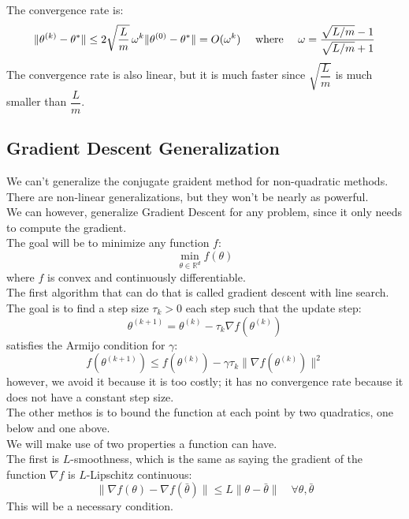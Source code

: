 \documentclass[12pt]{article}
\begin{document}
The convergence rate is:
\[ \|\theta^{(k)} - \theta^*\| \leq 2 
\sqrt{\frac{L}{m}} \, \omega^k \|\theta^{(0)} 
- \theta^*\| = O(\omega^k) 
\quad \text{ where } \quad \omega = 
\frac{\sqrt{L/m} - 1}{\sqrt{L/m} + 1} \]
The convergence rate is also linear, but it is much faster
since $\sqrt{\dfrac{L}{m}}$ is much smaller 
than $\dfrac{L}{m}$. \\
\newpage

\subsection*{Gradient Descent Generalization}

We can't generalize the conjugate graident method
for non-quadratic methods. \\
There are non-linear generalizations, 
but they won't be nearly as powerful. \\

We can however, generalize Gradient Descent
for any problem, since it only needs
to compute the gradient. \\

The goal will be to minimize any function $f$:
\[ \min_{\theta \in \mathbb{R}^d} f(\theta) \]
where $f$ is convex and continuously 
differentiable. \\

The first algorithm that can do that is called
gradient descent with line search. \\
The goal is to find a step size $\tau_k > 0$
each step such that the update step:
\[ \theta^{(k+1)} = \theta^{(k)} 
- \tau_k \nabla f(\theta^{(k)})\]
satisfies the Armijo condition for $\gamma$:
\[ f(\theta^{(k+1)}) \leq f(\theta^{(k)}) 
- \gamma \tau_k \|\nabla f(\theta^{(k)})\|^2 \]
however, we avoid it because it is too
costly; it has no convergence rate because it
does not have a constant step size. \\

The other methos is to 
bound the function at each point
by two quadratics, one below and one above. \\

We will make use of two properties
a function can have. \\

The first is $L$-smoothness,
which is the same as saying the gradient
of the function $\nabla f$ is $L$-Lipschitz
continuous:
\[ \|\nabla f(\theta) - \nabla f(\bar{\theta})\| 
\leq L \|\theta - \bar{\theta}\| 
\quad \forall \theta, \bar{\theta}\]
This will be a necessary condition. \\
\end{document}
